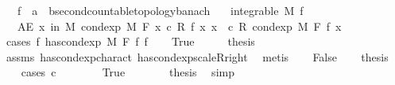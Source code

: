 \begin{isabellebody}
\ \ \ f\ {\isacharcolon}{\kern0pt}{\isacharcolon}{\kern0pt}\ {\isachardoublequoteopen}{\isacharprime}{\kern0pt}a\ {\isasymRightarrow}\ {\isacharprime}{\kern0pt}b{\isacharcolon}{\kern0pt}{\isacharcolon}{\kern0pt}{\isacharbraceleft}{\kern0pt}second{\isacharunderscore}{\kern0pt}countable{\isacharunderscore}{\kern0pt}topology{\isacharcomma}{\kern0pt}banach{\isacharbraceright}{\kern0pt}{\isachardoublequoteclose}\isanewline
\ \ \ {\isachardoublequoteopen}integrable\ M\ f{\isachardoublequoteclose}\isanewline
\ \ \ {\isachardoublequoteopen}AE\ x\ in\ M{\isachardot}{\kern0pt}\ cond{\isacharunderscore}{\kern0pt}exp\ M\ F\ {\isacharparenleft}{\kern0pt}{\isasymlambda}x{\isachardot}{\kern0pt}\ c\ {\isacharasterisk}{\kern0pt}\isactrlsub R\ f\ x{\isacharparenright}{\kern0pt}\ x\ {\isacharequal}{\kern0pt}\ c\ {\isacharasterisk}{\kern0pt}\isactrlsub R\ cond{\isacharunderscore}{\kern0pt}exp\ M\ F\ f\ x{\isachardoublequoteclose}\isanewline
%
\isadelimproof
%
\endisadelimproof
%
\isatagproof
{}\isamarkupfalse%
\ {\isacharparenleft}{\kern0pt}cases\ {\isachardoublequoteopen}{\isasymexists}f{\isacharprime}{\kern0pt}{\isachardot}{\kern0pt}\ has{\isacharunderscore}{\kern0pt}cond{\isacharunderscore}{\kern0pt}exp\ M\ F\ f\ f{\isacharprime}{\kern0pt}{\isachardoublequoteclose}{\isacharparenright}{\kern0pt}\isanewline
\ \ \isamarkupfalse%
\ True\isanewline
\ \ \isamarkupfalse%
\ \isamarkupfalse%
\ {\isacharquery}{\kern0pt}thesis\ \isamarkupfalse%
\ assms\ has{\isacharunderscore}{\kern0pt}cond{\isacharunderscore}{\kern0pt}exp{\isacharunderscore}{\kern0pt}charact\ has{\isacharunderscore}{\kern0pt}cond{\isacharunderscore}{\kern0pt}exp{\isacharunderscore}{\kern0pt}scaleR{\isacharunderscore}{\kern0pt}right\ \isamarkupfalse%
\ metis\isanewline
{}\isamarkupfalse%
\isanewline
\ \ \isamarkupfalse%
\ False\isanewline
\ \ \isamarkupfalse%
\ {\isacharquery}{\kern0pt}thesis\isanewline
\ \ \isamarkupfalse%
\ {\isacharparenleft}{\kern0pt}cases\ {\isachardoublequoteopen}c\ {\isacharequal}{\kern0pt}\ {}{\isachardoublequoteclose}{\isacharparenright}{\kern0pt}\isanewline
\ \ \ \ \isamarkupfalse%
\ True\isanewline
\ \ \ \ \isamarkupfalse%
\ \isamarkupfalse%
\ {\isacharquery}{\kern0pt}thesis\ \isamarkupfalse%
\ simp\isanewline
\ \ \isamarkupfalse%
\isanewline
\ \ \ \ \isamarkupfalse%

\end{isabellebody}
